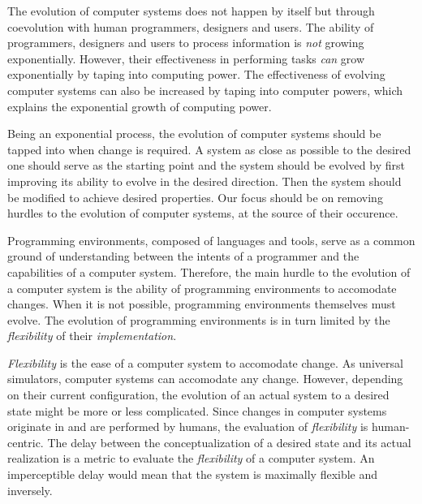 The evolution of computer systems does not happen by itself but
through coevolution with human programmers, designers and users. The ability of
programmers, designers and users to process information is \textit{not} growing
exponentially. However, their effectiveness in performing tasks \textit{can}
grow exponentially by taping into computing power. The effectiveness of
evolving computer systems can also be increased by taping into computer powers,
which explains the exponential growth of computing power.  

Being an exponential process, the evolution of computer systems should be
tapped into when change is required. A system as close as possible to the
desired one should serve as the starting point and the system should be evolved
by first improving its ability to evolve in the desired direction.  Then the
system should be modified to achieve desired properties. Our focus should be on
removing hurdles to the evolution of computer systems, at the source of their
occurence.

Programming environments, composed of languages and tools, serve as a common
ground of understanding between the intents of a programmer and the
capabilities of a computer system. Therefore, the main hurdle to the evolution
of a computer system is the ability of programming environments to accomodate
changes. When it is not possible, programming environments themselves must
evolve. The evolution of programming environments is in turn limited by the
\textit{flexibility} of their \textit{implementation}. 

\textit{Flexibility} is the ease of a computer system to accomodate change.
As universal simulators, computer systems can accomodate any change. However,
depending on their current configuration, the evolution of an actual system to
a desired state might be more or less complicated.  Since changes in computer
systems originate in and are performed by humans, the evaluation of
\textit{flexibility} is human-centric. The delay between the conceptualization
of a desired state and its actual realization is a metric to evaluate the
\textit{flexibility} of a computer system. An imperceptible delay would mean
that the system is maximally flexible and inversely.

